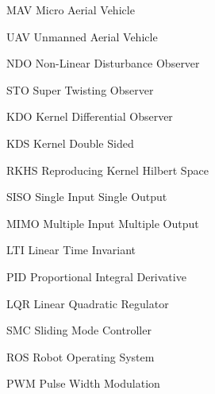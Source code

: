 \documentclass[letterpaper%
, twoside%
, 12pt%
,memoire%
, english%
,creativecommons,hyperref%
]{thETS}
\begin{document}
\tableofcontents

\listoftables

\listoffigures

\begin{listofabbr}[3cm]
\item[MAV]    Micro Aerial Vehicle
\item[UAV]    Unmanned Aerial Vehicle
\item[NDO]    Non-Linear Disturbance Observer
\item[STO]    Super Twisting Observer
\item[KDO]    Kernel Differential Observer
\item[KDS]    Kernel Double Sided
\item[RKHS]   Reproducing Kernel Hilbert Space
\item[SISO]   Single Input Single Output
\item[MIMO]   Multiple Input Multiple Output
\item[LTI]    Linear Time Invariant
\item[PID]    Proportional Integral Derivative 
\item[LQR]    Linear Quadratic Regulator
\item[SMC]    Sliding Mode Controller
\item[ROS]    Robot Operating System
\item[PWM]    Pulse Width Modulation

\end{listofabbr}
\end{document}
